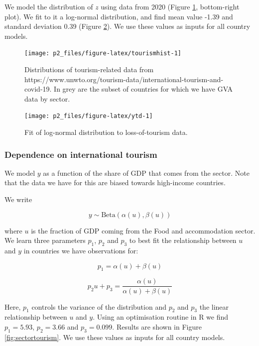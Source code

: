 \documentclass[
]{article}
\begin{document}
We model the distribution of \(z\) using data from 2020 (Figure \ref{fig:tourismhist}, bottom-right plot). We fit to it a log-normal distribution, and find mean value -1.39 and standard deviation 0.39 (Figure \ref{fig:ytd}). We use these values as inputs for all country models.

\begin{figure}

{\centering \texttt{[image: p2\_files/figure-latex/tourismhist-1]} 

}

\caption{Distributions of tourism-related data from https://www.unwto.org/tourism-data/international-tourism-and-covid-19. In grey are the subset of countries for which we have GVA data by sector.}\label{fig:tourismhist}
\end{figure}

\begin{figure}

{\centering \texttt{[image: p2\_files/figure-latex/ytd-1]} 

}

\caption{Fit of log-normal distribution to loss-of-tourism data.}\label{fig:ytd}
\end{figure}

\newpage

\hypertarget{dependence-on-international-tourism}{%
\subsubsection{Dependence on international tourism}\label{dependence-on-international-tourism}}

We model \(y\) as a function of the share of GDP that comes from the sector. Note that the data we have for this are biased towards high-income countries.

We write

\[y\sim\text{Beta}(\alpha(u),\beta(u))\]

where \(u\) is the fraction of GDP coming from the Food and accommodation sector. We learn three parameters \(p_1\), \(p_2\) and \(p_3\) to best fit the relationship between \(u\) and \(y\) in countries we have observations for:

\[p_1 = \alpha(u)+\beta(u)\]

\[p_2u + p_3 = \frac{\alpha(u)}{\alpha(u)+\beta(u)}\]

Here, \(p_1\) controls the variance of the distribution and \(p_2\) and \(p_3\) the linear relationship between \(u\) and \(y\). Using an optimisation routine in R we find \(p_1=5.93\), \(p_2=3.66\) and \(p_3=0.099\). Results are shown in Figure \ref{fig:sectortourism}. We use these values as inputs for all country models.
\end{document}
